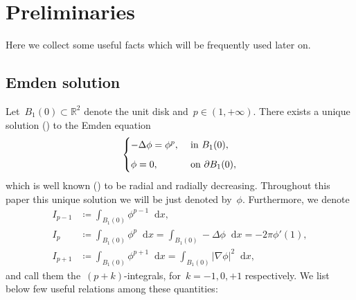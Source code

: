 \documentclass[10pt]{amsart}
\newcommand{\R}{\mathbb{R}}
\newcommand{\dd}{\mathop{}\!\mathrm{d}}
\def\R{\mathbb{R}}
\begin{document}
\bigskip

\section{Preliminaries}\label{sec2}

Here we collect some useful facts which will be frequently used later on.

\subsection{Emden solution}

    Let~$B_1(0)\subset\R^2$ denote the unit disk and~$p\in (1,+\infty)$.
    There exists a unique solution (\cite{gnn}) to the Emden equation
    \begin{align}\label{eq:Emden}
    \begin{cases}
         -\Delta\phi=\phi^p, & \mbox{ in } B_1(0), \vspace{2mm} \\
        \phi = 0, & \mbox{ on } \partial B_1(0),
    \end{cases}
    \end{align}
    which is well known (\cite{gnn}) to be radial and radially decreasing.
    Throughout this paper this unique solution we will be just denoted by~$\phi$.
    Furthermore, we denote
    \begin{align}\label{Ip-1}
        I_{p-1}& \coloneqq \int_{B_1(0)}\phi^{p-1}\dd{x}, \\ \label{Ip}
        I_{p} & \coloneqq \int_{B_1(0)} \phi^p \dd{x}=\int_{B_1(0)} -\Delta \phi\dd{x}=-2\pi\phi'(1), \\ \nonumber
        I_{p+1} & \coloneqq \int_{B_1(0)} \phi^{p+1}\dd{x}=\int_{B_1(0)}|\nabla\phi|^2\dd{x},
    \end{align}
    and call them the~$(p+k)$-integrals, for~$k=-1,0,+1$ respectively.
    We list below few useful relations among these quantities:
\end{document}
